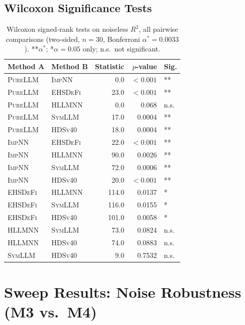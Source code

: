 \documentclass[twoside,11pt]{article}
\newcommand{\PureLLM}{\textsc{PureLLM}}
\newcommand{\INN}{\textsc{ImpNN}}
\newcommand{\EHD}{\textsc{EHSDeFi}}
\newcommand{\HSL}{\textsc{HLLMNN}}
\newcommand{\SEL}{\textsc{SymLLM}}
\newcommand{\HDS}{\textsc{HDSv40}}
\newcommand{\Rsq}{R^{2}}
\begin{document}
\subsection{Wilcoxon Significance Tests}
\label{sec:noiseless:wilcoxon}

\begin{table}[ht]
\centering
\caption{Wilcoxon signed-rank tests on noiseless $\Rsq$, all pairwise
         comparisons (two-sided, $n=30$, Bonferroni $\alpha^*=0.0033$).
         **$\alpha^*$; *$\alpha=0.05$ only; n.s.~not significant.}
\label{tab:wilcoxon}
\small
\begin{tabular}{llrrl}
\toprule
\textbf{Method A} & \textbf{Method B} & \textbf{Statistic} &
  \textbf{$p$-value} & \textbf{Sig.} \\
\midrule
\PureLLM & \INN  &   0.0 & $<0.001$ & ** \\
\PureLLM & \EHD  &  23.0 & $<0.001$ & ** \\
\PureLLM & \HSL  &   0.0 &  0.068   & n.s. \\
\PureLLM & \SEL  &  17.0 &  0.0004  & ** \\
\PureLLM & \HDS  &  18.0 &  0.0004  & ** \\
\midrule
\INN     & \EHD  &  22.0 & $<0.001$ & ** \\
\INN     & \HSL  &  90.0 &  0.0026  & ** \\
\INN     & \SEL  &  72.0 &  0.0006  & ** \\
\INN     & \HDS  &  20.0 & $<0.001$ & ** \\
\midrule
\EHD     & \HSL  & 114.0 &  0.0137  & *  \\
\EHD     & \SEL  & 116.0 &  0.0155  & *  \\
\EHD     & \HDS  & 101.0 &  0.0058  & *  \\
\midrule
\HSL     & \SEL  &  73.0 &  0.0824  & n.s. \\
\HSL     & \HDS  &  74.0 &  0.0883  & n.s. \\
\SEL     & \HDS  &   9.0 &  0.7532  & n.s. \\
\bottomrule
\end{tabular}
\end{table}

\section{Sweep Results: Noise Robustness (M3 vs.\ M4)}
\label{sec:noise}
\end{document}
